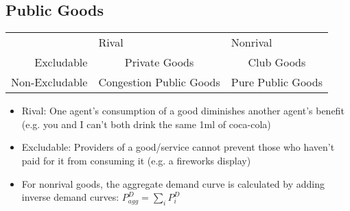 \documentclass{article}
\newcommand{\blue}[1]{{\color{blue}#1}}
\begin{document}
\subsection{Public Goods}
\begin{center}
	\begin{tabular}{rp{1cm}p{1cm}}
					& Rival 										& Nonrival 										\\\cline{2-3}
	Excludable		& \multicolumn{1}{|c|}{Private Goods}			& \multicolumn{1}{|c|}{Club Goods}				\\\cline{2-3}
	Non-Excludable	& \multicolumn{1}{|c|}{Congestion Public Goods}	& \multicolumn{1}{|c|}{Pure Public Goods}		\\\cline{2-3}
	\end{tabular}
\end{center}
\begin{itemize}
	\item \blue{Rival:} One agent's consumption of a good diminishes another agent's benefit (e.g. you and I can't both drink the same 1ml of coca-cola)
	\item \blue{Excludable:} Providers of a good/service cannot prevent those who haven't paid for it from consuming it (e.g. a fireworks display)
	\item For nonrival goods, the aggregate demand curve is calculated by adding inverse demand curves: $P^D_{agg}=\sum_iP^D_i$
\end{itemize}
\end{document}
